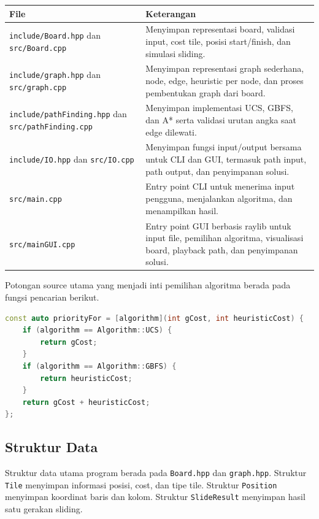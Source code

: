 \documentclass[a4paper,11pt]{article}
\begin{document}
\begin{longtable}{|p{4cm}|p{10cm}|}
    \hline
    \textbf{File} & \textbf{Keterangan} \\
    \hline
    \endhead
    \texttt{include/Board.hpp} dan \texttt{src/Board.cpp} & Menyimpan representasi board, validasi input, cost tile, posisi start/finish, dan simulasi sliding. \\
    \hline
    \texttt{include/graph.hpp} dan \texttt{src/graph.cpp} & Menyimpan representasi graph sederhana, node, edge, heuristic per node, dan proses pembentukan graph dari board. \\
    \hline
    \texttt{include/pathFinding.hpp} dan \texttt{src/pathFinding.cpp} & Menyimpan implementasi UCS, GBFS, dan A* serta validasi urutan angka saat edge dilewati. \\
    \hline
    \texttt{include/IO.hpp} dan \texttt{src/IO.cpp} & Menyimpan fungsi input/output bersama untuk CLI dan GUI, termasuk path input, path output, dan penyimpanan solusi. \\
    \hline
    \texttt{src/main.cpp} & Entry point CLI untuk menerima input pengguna, menjalankan algoritma, dan menampilkan hasil. \\
    \hline
    \texttt{src/mainGUI.cpp} & Entry point GUI berbasis raylib untuk input file, pemilihan algoritma, visualisasi board, playback path, dan penyimpanan solusi. \\
    \hline
\end{longtable}

Potongan source utama yang menjadi inti pemilihan algoritma berada pada fungsi pencarian berikut.

\begin{lstlisting}[language=C++, caption=Penentuan Prioritas Algoritma]
const auto priorityFor = [algorithm](int gCost, int heuristicCost) {
    if (algorithm == Algorithm::UCS) {
        return gCost;
    }
    if (algorithm == Algorithm::GBFS) {
        return heuristicCost;
    }
    return gCost + heuristicCost;
};
\end{lstlisting}

\subsection{Struktur Data}
Struktur data utama program berada pada \texttt{Board.hpp} dan \texttt{graph.hpp}. Struktur \texttt{Tile} menyimpan informasi posisi, cost, dan tipe tile. Struktur \texttt{Position} menyimpan koordinat baris dan kolom. Struktur \texttt{SlideResult} menyimpan hasil satu gerakan sliding.
\end{document}
